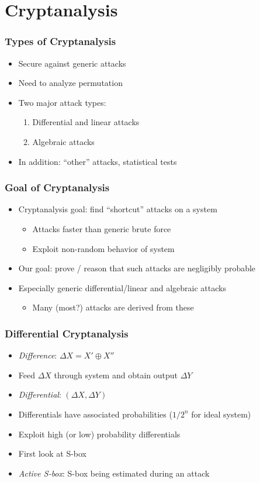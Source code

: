 \section{Cryptanalysis}
\begin{frame}
\frametitle{Types of Cryptanalysis}
\begin{itemize}
  \item Secure against generic attacks
  \item Need to analyze permutation
  \item Two major attack types:
  \begin{enumerate}
    \item Differential and linear attacks
    \item Algebraic attacks
  \end{enumerate}
  \item In addition: ``other'' attacks, statistical tests
\end{itemize}
\end{frame}

\begin{frame}
\frametitle{Goal of Cryptanalysis}
\begin{itemize}
  \item Cryptanalysis goal: find ``shortcut'' attacks on a system
  \begin{itemize}
    \item Attacks faster than generic brute force
    \item Exploit non-random behavior of system
  \end{itemize}
  \item Our goal: prove / reason that such attacks are negligibly probable
  \item Especially generic differential/linear and algebraic attacks
  \begin{itemize}
    \item Many (most?) attacks are derived from these
  \end{itemize}
\end{itemize}
\end{frame}

\begin{frame}
\frametitle{Differential Cryptanalysis}
\begin{itemize}
  \item \emph{Difference}: $\Delta X = X' \oplus X''$
  \item Feed $\Delta X$ through system and obtain output $\Delta Y$
  \item \emph{Differential}: $(\Delta X, \Delta Y)$
  \item Differentials have associated probabilities ($1/2^n$ for ideal system)
  \item Exploit high (or low) probability differentials
  \item First look at S-box
  \item \emph{Active S-box}: S-box being estimated during an attack
\end{itemize}
\end{frame}

